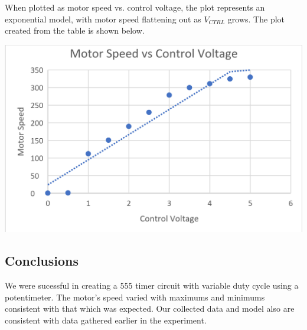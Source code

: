 \documentclass[notitlepage, 12pt]{report}  %
\begin{document}
When plotted as motor speed vs. control voltage, the plot represents an exponential model, with motor speed flattening out as $V_{CTRL}$ grows.
The plot created from the table is shown below. \\

\begin{center}
    \includegraphics[scale=0.2]{graph.png}
\end{center}

\subsection*{Conclusions}
\indent\indent We were sucessful in creating a 555 timer circuit with variable duty cycle using a potentimeter. The motor's 
speed varied with maximums and minimums consistent with that which was expected. Our collected data and model also are consistent
with data gathered earlier in the experiment.\\

\newpage

\printbibliography[title={\Large References}] %
\end{document}
